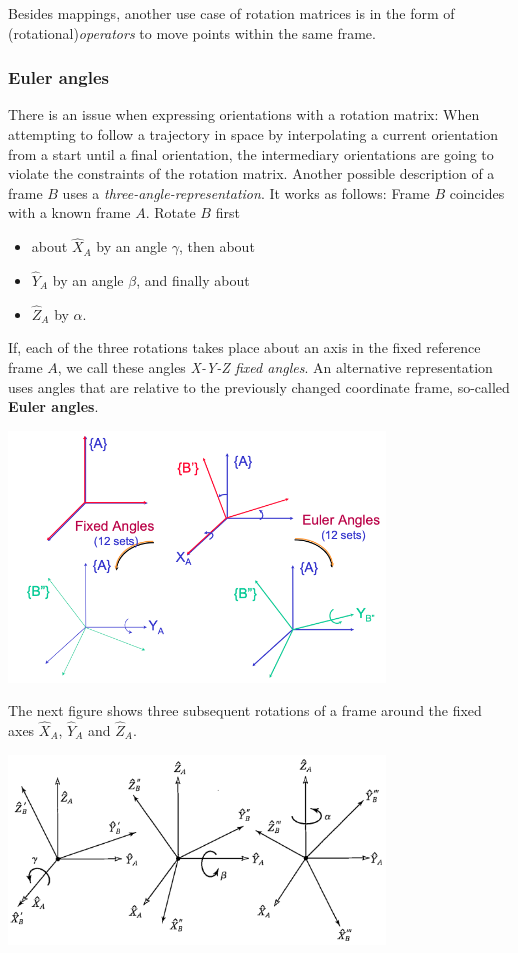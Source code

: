 Besides mappings, another use case of rotation matrices is in the form of (rotational)\textit{operators} to move points within the same frame.

\subsubsection{Euler angles}
There is an issue when expressing orientations with a rotation matrix: When attempting to follow a trajectory in space by interpolating a current orientation from a start until a final orientation, the intermediary orientations are going to violate the constraints of the rotation matrix. Another possible description of a frame $B$ uses a \textit{three-angle-representation}. It works as follows: Frame $B$ coincides with a known frame $A$. Rotate $B$ first
\begin{itemize}
	\item about $ \hat{X}_{A} $ by an angle \(\gamma\), then about
	\item $ \hat{Y}_{A} $ by an angle \(\beta\), and finally about
	\item $ \hat{Z}_{A} $ by \(\alpha\).
\end{itemize}
If, each of the three rotations takes place about an axis in the fixed reference frame $A$, we call these angles \textit{X-Y-Z fixed angles}. An alternative representation uses angles that are relative to the previously changed coordinate frame, so-called \textbf{Euler angles}.

\begin{center}
	\includegraphics[width=10cm]{sections/imgs/2_fixed_relative_angles.png}
\end{center}

The next figure shows three subsequent rotations of a frame around the fixed axes $\hat X_A$, $\hat Y_A$ and $\hat Z_A$.

\begin{center}
	\includegraphics[width=10cm]{sections/imgs/9.png}
\end{center}

